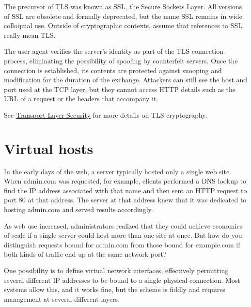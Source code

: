 The precursor of TLS was known as
\protect\hypertarget{part0027_split_006.htmlux5cux23_idIndexMarker2774}{}{}\protect\hypertarget{part0027_split_006.htmlux5cux23_idIndexMarker2775}{}{}SSL,
the Secure Sockets Layer. All versions of SSL are obsolete and formally
deprecated, but the name SSL remains in wide colloquial use. Outside of
cryptographic contexts, assume that references to SSL really mean TLS.

The user agent verifies the server's identity as part of the TLS
connection process, eliminating the possibility of spoofing by
counterfeit servers. Once the connection is established, its contents
are protected against snooping and modification for the duration of the
exchange. Attackers can still see the host and port used at the TCP
layer, but they cannot access HTTP details such as the URL of a request
or the headers that accompany it.

See
\protect\hyperlink{part0037_split_040.htmlux5cux23_idTextAnchor1727}{{Transport
Layer Security}} for more details on TLS cryptography.



\section{Virtual hosts}

\protect\hypertarget{part0027_split_007.htmlux5cux23_idIndexMarker2776}{}{}\protect\hypertarget{part0027_split_007.htmlux5cux23_idIndexMarker2777}{}{}\protect\hypertarget{part0027_split_007.htmlux5cux23_idIndexMarker2778}{}{}In
the early days of the web, a server typically hosted only a single web
site. When admin.com was requested, for example, clients performed a DNS
lookup to find the IP address associated with that name and then sent an
HTTP request to port 80 at that address. The server at that address knew
that it was dedicated to hosting admin.com and served results
accordingly.

As web use increased, administrators realized that they could achieve
economies of scale if a single server could host more than one site at
once. But how do you distinguish requests bound for admin.com from those
bound for example.com if both kinds of traffic end up at the same
network port?

One possibility is to define virtual network interfaces, effectively
permitting several different IP addresses to be bound to a single
physical connection. Most systems allow this, and it works fine, but the
scheme is fiddly and requires management at several different layers.

